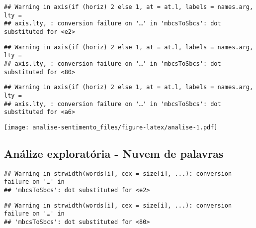 \documentclass[
]{article}
\newenvironment{Shaded}{\begin{snugshade}}{\end{snugshade}}
\newcommand{\AttributeTok}[1]{\textcolor[rgb]{0.77,0.63,0.00}{#1}}
\newcommand{\ConstantTok}[1]{\textcolor[rgb]{0.00,0.00,0.00}{#1}}
\newcommand{\DecValTok}[1]{\textcolor[rgb]{0.00,0.00,0.81}{#1}}
\newcommand{\FloatTok}[1]{\textcolor[rgb]{0.00,0.00,0.81}{#1}}
\newcommand{\FunctionTok}[1]{\textcolor[rgb]{0.00,0.00,0.00}{#1}}
\newcommand{\NormalTok}[1]{#1}
\newcommand{\SpecialCharTok}[1]{\textcolor[rgb]{0.00,0.00,0.00}{#1}}
\newcommand{\StringTok}[1]{\textcolor[rgb]{0.31,0.60,0.02}{#1}}
\begin{document}
\begin{verbatim}
## Warning in axis(if (horiz) 2 else 1, at = at.l, labels = names.arg, lty =
## axis.lty, : conversion failure on '…' in 'mbcsToSbcs': dot substituted for <e2>
\end{verbatim}

\begin{verbatim}
## Warning in axis(if (horiz) 2 else 1, at = at.l, labels = names.arg, lty =
## axis.lty, : conversion failure on '…' in 'mbcsToSbcs': dot substituted for <80>
\end{verbatim}

\begin{verbatim}
## Warning in axis(if (horiz) 2 else 1, at = at.l, labels = names.arg, lty =
## axis.lty, : conversion failure on '…' in 'mbcsToSbcs': dot substituted for <a6>
\end{verbatim}

\texttt{[image: analise-sentimento\_files/figure-latex/analise-1.pdf]}

\hypertarget{anuxe1lize-exploratuxf3ria---nuvem-de-palavras}{%
\subsection{Análize exploratória - Nuvem de
palavras}\label{anuxe1lize-exploratuxf3ria---nuvem-de-palavras}}

\begin{Shaded}
\end{Shaded}

\begin{verbatim}
## Warning in strwidth(words[i], cex = size[i], ...): conversion failure on '…' in
## 'mbcsToSbcs': dot substituted for <e2>
\end{verbatim}

\begin{verbatim}
## Warning in strwidth(words[i], cex = size[i], ...): conversion failure on '…' in
## 'mbcsToSbcs': dot substituted for <80>
\end{verbatim}
\end{document}
